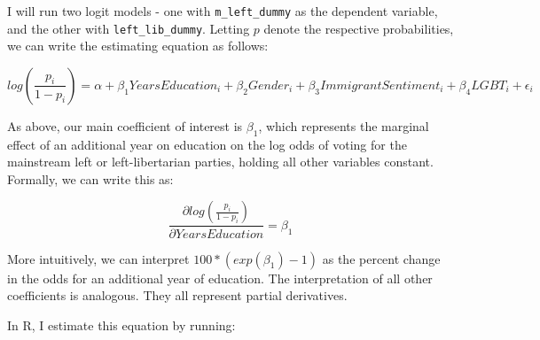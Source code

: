 \documentclass[
]{article}
\begin{document}
I will run two logit models - one with \texttt{m\_left\_dummy} as the
dependent variable, and the other with \texttt{left\_lib\_dummy}.
Letting \(p\) denote the respective probabilities, we can write the
estimating equation as follows:

\[
log(\frac{p_{i}}{1-p_{i}}) = \alpha + \beta_{1} YearsEducation_{i} + \beta_{2} Gender_{i} + \beta_{3} ImmigrantSentiment_{i} + \beta_{4} LGBT_{i} + \epsilon_{i}
\]

As above, our main coefficient of interest is \(\beta_{1}\), which
represents the marginal effect of an additional year on education on the
log odds of voting for the mainstream left or left-libertarian parties,
holding all other variables constant. Formally, we can write this as:

\[
\frac{\partial log(\frac{p_{i}}{1-p_{i}})}{\partial YearsEducation} = \beta_{1}
\]

More intuitively, we can interpret \(100*(exp(\beta_{1})-1)\) as the
percent change in the odds for an additional year of education. The
interpretation of all other coefficients is analogous. They all
represent partial derivatives.

In R, I estimate this equation by running:
\end{document}
